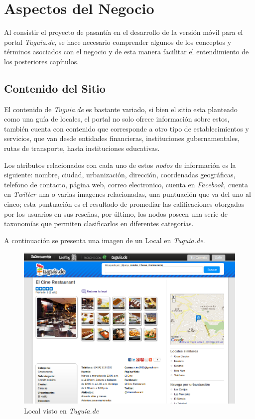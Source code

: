 \section{Aspectos del Negocio} \label{sect:aspectos_negocio}
  
Al consistir el proyecto de pasantía en el desarrollo de la versión móvil para el portal \textit{Tuguia.de}, se hace necesario comprender algunos de los conceptos y términos asociados con el negocio y de esta manera facilitar el entendimiento de los posteriores capítulos.

\subsection{Contenido del Sitio} \label{subsect:contenido}

El contenido de \textit{Tuguia.de} es bastante variado, si bien el sitio esta planteado como una guía de locales, el portal no solo ofrece información sobre estos, también cuenta con contenido que corresponde a otro tipo de establecimientos y servicios, que van desde entidades financieras, instituciones gubernamentales, rutas de transporte, hasta  instituciones educativas. 

Los atributos relacionados con cada uno de estos \textit{nodos} de información es la siguiente: nombre, ciudad, urbanización, dirección, coordenadas geográficas, telefono de contacto, página web, correo electronico, cuenta en \textit{Facebook}, cuenta en \textit{Twitter} una o varias imagenes relacionadas, una puntuación que va del uno al cinco; esta puntuación es el resultado de promediar las calificaciones otorgadas por los usuarios en sus reseñas, por último, los nodos poseen una serie de taxonomías que permiten clasificarlos en diferentes categorías. 

A continuación se presenta una imagen de un Local en \textit{Tuguia.de}.

\begin{figure}[h]
	\begin{center}
		\includegraphics[scale=0.4]{imagenes/local_tgd.png}
	\end{center}
	\caption{
		\label{fig:localtgd}
		Local visto en \textit{Tuguia.de} 
	}
\end{figure}



